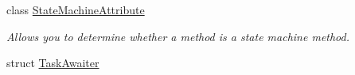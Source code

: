 \begin{DoxyCompactItemize}
class \hyperlink{class_system_1_1_runtime_1_1_compiler_services_1_1_state_machine_attribute}{State\+Machine\+Attribute}
\begin{DoxyCompactList}\small\item\em Allows you to determine whether a method is a state machine method. \end{DoxyCompactList}\item 
struct \hyperlink{struct_system_1_1_runtime_1_1_compiler_services_1_1_task_awaiter}{Task\+Awaiter}
\end{DoxyCompactItemize}
